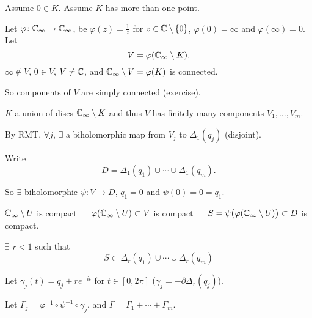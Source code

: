 \documentclass[10pt,aspectratio=169]{beamer}
\begin{document}
\begin{frame}
Assume $0 \in K$. \pause
Assume $K$ has more than one point.

\medskip
\pause

Let $\varphi \colon {\mathbb{C}}_\infty \to {\mathbb{C}}_\infty$, be $\varphi(z) = \frac{1}{z}$ for $z \in {\mathbb{C}} \setminus \{ 0 \}$,
$\varphi(0) = \infty$ and $\varphi(\infty) = 0$. \pause
Let
\[
V = \varphi({\mathbb{C}}_\infty \setminus K) .
\]
\pause
$\infty \notin V$,
\pause
$0 \in V$,
\pause
$V \not= {\mathbb{C}}$,
\pause
and ${\mathbb{C}}_\infty \setminus V = \varphi(K)$ is connected.

\pause
So components of $V$ are simply connected (exercise).

\pause
$K$ a union of discs \wthus
${\mathbb{C}}_\infty \setminus K$ and thus $V$ has finitely many components $V_1,\ldots,V_m$.

\medskip
\pause

By RMT, $\forall j$, $\exists$
a biholomorphic map from $V_j$ to $\Delta_1(q_j)$ (disjoint).

\pause
Write \[D = \Delta_1(q_1) \cup \cdots \cup \Delta_1(q_m).\]

\pause
So $\exists$ biholomorphic $\psi \colon V \to D$, \pause $q_1=0$ and
$\psi(0)=0=q_1$.

\pause
${\mathbb{C}}_\infty \setminus U$ is compact
\pause 
~\thus~
$\varphi({\mathbb{C}}_\infty \setminus U) \subset V$ is compact
\pause
~\thus~
$S = \psi\bigl(\varphi({\mathbb{C}}_\infty \setminus U)\bigr) \subset D$
is compact.

\pause
$\exists$ $r < 1$ such that
\[
S \subset \Delta_r(q_1) \cup \cdots \cup \Delta_r(q_m)
\]

\pause
Let $\gamma_j(t) = q_j + r e^{-it}$ for $t \in [0,2\pi]$ \quad ($\gamma_j = -\partial
\Delta_r(q_j)$).

\pause
Let $\Gamma_j = \varphi^{-1} \circ \psi^{-1} \circ \gamma_j$, and $\Gamma = \Gamma_1 +
\cdots + \Gamma_m$.
\end{frame}
\end{document}
